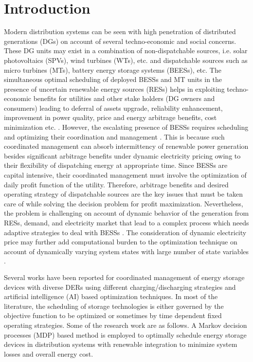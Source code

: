 \documentclass[journal]{IEEEtran}
\begin{document}
	\section{Introduction}\label{sec1}	
	Modern distribution systems can be seen with high penetration of distributed generations (DGs) on account of several techno-economic and social concerns. These DG units may exist in a combination of non-dispatchable sources, i.e. solar photovoltaics (SPVs), wind turbines (WTs), etc. and dispatchable sources such as micro turbines (MTs), battery energy storage systems (BEESs), etc. The simultaneous optimal scheduling of deployed BESSs and MT units in the presence of uncertain renewable energy sources (RESs) helps in exploiting techno-economic benefits for utilities and other stake holders (DG owners and consumers) leading to  deferral of assets upgrade, reliability enhancement, improvement in power quality, price and energy arbitrage benefits, cost minimization etc. \cite{1300713, 7973037, 7879188}. However, the escalating presence of BESSs requires scheduling and optimizing their coordination and management \cite{6652316,6695368}. This is because such coordinated management can absorb intermittency of renewable power generation besides significant arbitrage benefits under dynamic electricity pricing owing to their flexibility of dispatching energy at appropriate time. Since BESSs are capital intensive, their coordinated management must involve the optimization of daily profit function of the utility. Therefore, arbitrage benefits and desired operating strategy of dispatchable sources are the key issues that must be taken care of while solving the decision problem for profit maximization. Nevertheless, the problem is challenging on account of dynamic behavior of the generation from RESs, demand, and electricity market that lead to a complex process which needs adaptive strategies to deal with BESSs \cite{reddy2011linden}. The consideration of dynamic electricity price may further add computational burden to the optimization technique on account of dynamically varying system states with large number of state variables \cite{Hannah:2011:ADP:3104482.3104525}.
%	
\par	Several works \cite{7339477,1519727,5438853,6797967,6310769,7321810,7422915} have been reported for coordinated management of energy storage devices with diverse DERs using different charging/discharging strategies and artificial intelligence (AI) based optimization techniques. In most of the literature, the scheduling of storage technologies is either governed by the objective function to be optimized or sometimes by time dependent fixed operating strategies. Some of the research work are as follows. A Markov decision processes (MDP) based method \cite{7339477} is employed to optimally schedule energy storage devices in distribution systems with renewable integration to minimize system losses and overall energy cost. 
\end{document}
